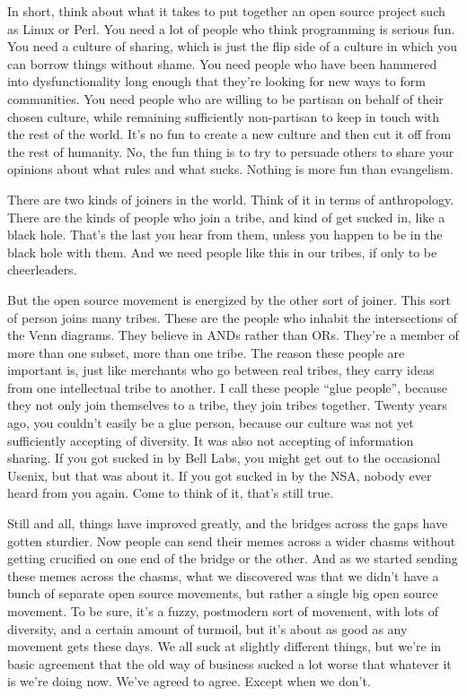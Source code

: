 \documentclass[10pt,letterpaper]{article}
\newcommand{\acro}[1]{{\small\MakeUppercase #1\spacefactor1000}}
\newcommand{\logop}[1]{{\small\MakeUppercase #1\spacefactor1000}}
\begin{document}
In short, think about what it takes to put together an open source project
such as Linux or Perl. You need a lot of people who think programming is
serious fun. You need a culture of sharing, which is just the flip side of a
culture in which you can borrow things without shame. You need people who
have been hammered into dysfunctionality long enough that they're looking for
new ways to form communities. You need people who are willing to be partisan
on behalf of their chosen culture, while remaining sufficiently non-partisan
to keep in touch with the rest of the world. It's no fun to create a new
culture and then cut it off from the rest of humanity. No, the fun thing is
to try to persuade others to share your opinions about what rules and what
sucks. Nothing is more fun than evangelism.

There are two kinds of joiners in the world. Think of it in terms of
anthropology. There are the kinds of people who join a tribe, and kind of get
sucked in, like a black hole. That's the last you hear from them, unless you
happen to be in the black hole with them. And we need people like this in our
tribes, if only to be cheerleaders.

But the open source movement is energized by the other sort of joiner. This
sort of person joins many tribes. These are the people who inhabit the
intersections of the Venn diagrams. They believe in \logop{AND}s rather than \logop{OR}s.
They're a member of more than one subset, more than one tribe. The reason
these people are important is, just like merchants who go between real
tribes, they carry ideas from one intellectual tribe to another. I call these
people ``glue people'', because they not only join themselves to a tribe,
they join tribes together. Twenty years ago, you couldn't easily be a glue
person, because our culture was not yet sufficiently accepting of diversity.
It was also not accepting of information sharing. If you got sucked in by
Bell Labs, you might get out to the occasional Usenix, but that was about it.
If you got sucked in by the \acro{NSA}, nobody ever heard from you again. Come to
think of it, that's still true.

Still and all, things have improved greatly, and the bridges across the gaps
have gotten sturdier. Now people can send their memes across a wider chasms
without getting crucified on one end of the bridge or the other. And as we
started sending these memes across the chasms, what we discovered was that we
didn't have a bunch of separate open source movements, but rather a single
big open source movement. To be sure, it's a fuzzy, postmodern sort of
movement, with lots of diversity, and a certain amount of turmoil, but it's
about as good as any movement gets these days. We all suck at slightly
different things, but we're in basic agreement that the old way of business
sucked a lot worse that whatever it is we're doing now. We've agreed to
agree. Except when we don't.
\end{document}
